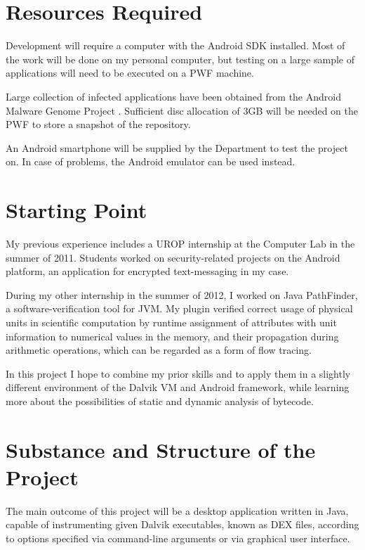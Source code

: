 \documentclass[12pt]{article}
\begin{document}
\section*{Resources Required}

Development will require a computer with the Android SDK installed. Most 
of the work will be done on my personal computer, but testing on a large 
sample of applications will need to be executed on a PWF machine. 

Large collection of infected applications have been obtained from the
Android Malware Genome Project \cite{www.malgenomeproject.org}. 
Sufficient disc allocation of 3GB will be needed on the PWF to store
a snapshot of the repository. 

An Android smartphone will be supplied by the Department to test 
the project on. In case of problems, the Android emulator can be used 
instead.

\section*{Starting Point}

My previous experience includes a UROP internship at the Computer Lab
in the summer of 2011. Students worked on security-related projects on
the Android platform, an application for encrypted text-messaging in my
case.

During my other internship in the summer of 2012, I worked on Java PathFinder,
a software-verification tool for JVM. My plugin verified correct usage of 
physical units in scientific computation by runtime assignment of attributes 
with unit information to numerical values in the memory, and their propagation 
during arithmetic operations, which can be regarded as a form of flow tracing. 

In this project I hope to combine my prior skills and to apply them in a 
slightly different environment of the Dalvik VM and Android framework,
while learning more about the possibilities of static and dynamic analysis
of bytecode.

\section*{Substance and Structure of the Project}

The main outcome of this project will be a desktop application written 
in Java, capable of instrumenting given Dalvik executables, known as DEX
files, according to options specified via command-line arguments or via
graphical user interface.
\end{document}
